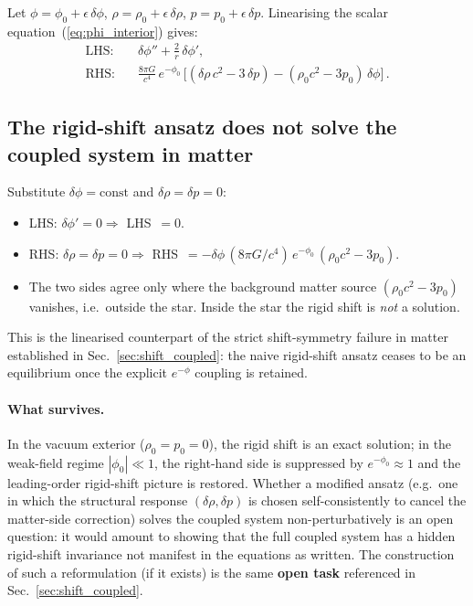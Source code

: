 \documentclass[11pt]{article}
\begin{document}
Let $\phi = \phi_0 + \epsilon\,\delta\phi$,
$\rho = \rho_0 + \epsilon\,\delta\rho$,
$p = p_0 + \epsilon\,\delta p$.  Linearising the
scalar equation~(\ref{eq:phi_interior}) gives:
\begin{align}
  \text{LHS:}\quad &
  \delta\phi'' + \frac{2}{r}\,\delta\phi',
  \label{eq:LHS_pert}\\[4pt]
  \text{RHS:}\quad &
  \frac{8\pi G}{c^4}\,e^{-\phi_0}\,\bigl[
  (\delta\rho\,c^2 - 3\,\delta p)
  - (\rho_0 c^2 - 3p_0)\,\delta\phi\bigr]\,.
  \label{eq:RHS_pert}
\end{align}

\subsection{The rigid-shift ansatz does not solve the
coupled system in matter}

Substitute $\delta\phi = \mathrm{const}$ and
$\delta\rho = \delta p = 0$:
\begin{itemize}
\item LHS: $\delta\phi' = 0 \Rightarrow$ LHS~$=0$.
\item RHS: $\delta\rho = \delta p = 0 \Rightarrow$
  RHS~$= -\delta\phi\,(8\pi G/c^4)\,e^{-\phi_0}\,
  (\rho_0 c^2 - 3p_0)$.
\item The two sides agree only where the background
  matter source $(\rho_0 c^2 - 3p_0)$ vanishes, i.e.\
  outside the star.  Inside the star the rigid shift
  is \emph{not} a solution.
\end{itemize}
This is the linearised counterpart of the strict
shift-symmetry failure in matter established in
Sec.~\ref{sec:shift_coupled}: the naive
rigid-shift ansatz ceases to be an equilibrium once the
explicit $e^{-\phi}$ coupling is retained.

\paragraph{What survives.}  In the vacuum exterior
($\rho_0 = p_0 = 0$), the rigid shift is an exact
solution; in the weak-field regime $|\phi_0| \ll 1$,
the right-hand side is suppressed by $e^{-\phi_0} \approx 1$
and the leading-order rigid-shift picture is restored.
Whether a modified ansatz (e.g.\ one in which the
structural response $(\delta\rho,\delta p)$ is chosen
self-consistently to cancel the matter-side correction)
solves the coupled system non-perturbatively is an open
question: it would amount to showing that the full
coupled system has a hidden rigid-shift invariance not
manifest in the equations as written.  The construction
of such a reformulation (if it exists) is the same
\textbf{open task} referenced in
Sec.~\ref{sec:shift_coupled}.
\end{document}
